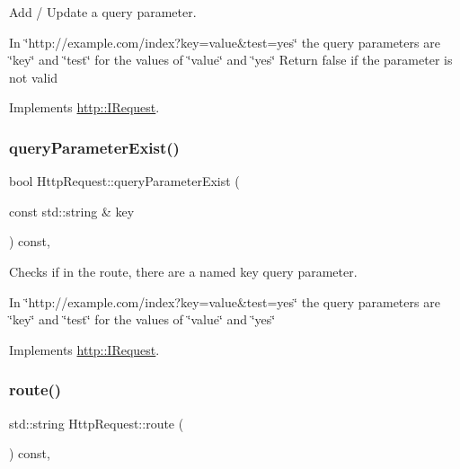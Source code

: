 Add / Update a query parameter. 

In \char`\"{}http\+://example.\+com/index?key=value\&test=yes\char`\"{} the query parameters are \char`\"{}key\char`\"{} and \char`\"{}test\char`\"{} for the values of \char`\"{}value\char`\"{} and \char`\"{}yes\char`\"{} Return false if the parameter is not valid 

Implements \hyperlink{structhttp_1_1IRequest_aded13d22f58bf5f622524929a52de7ef}{http\+::\+I\+Request}.

\mbox{\label{classHttpRequest_a81ce6a379efeba53bd3d40699462628b}} 
\subsubsection{\texorpdfstring{query\+Parameter\+Exist()}{queryParameterExist()}}
{\footnotesize\ttfamily bool Http\+Request\+::query\+Parameter\+Exist (\begin{DoxyParamCaption}\item[{const std\+::string \&}]{key }\end{DoxyParamCaption}) const\hspace{0.3cm}{\ttfamily [virtual]}, {\ttfamily [noexcept]}}



Checks if in the route, there are a named \textquotesingle{}key\textquotesingle{} query parameter. 

In \char`\"{}http\+://example.\+com/index?key=value\&test=yes\char`\"{} the query parameters are \char`\"{}key\char`\"{} and \char`\"{}test\char`\"{} for the values of \char`\"{}value\char`\"{} and \char`\"{}yes\char`\"{} 

Implements \hyperlink{structhttp_1_1IRequest_a3f2a5c8775396ac91971881d88d59c62}{http\+::\+I\+Request}.

\mbox{\label{classHttpRequest_a313930a1717c2635ad092b7f6c7d2460}} 
\subsubsection{\texorpdfstring{route()}{route()}\hspace{0.1cm}{\footnotesize\ttfamily [1/2]}}
{\footnotesize\ttfamily std\+::string Http\+Request\+::route (\begin{DoxyParamCaption}{ }\end{DoxyParamCaption}) const\hspace{0.3cm}{\ttfamily [virtual]}, {\ttfamily [noexcept]}}



